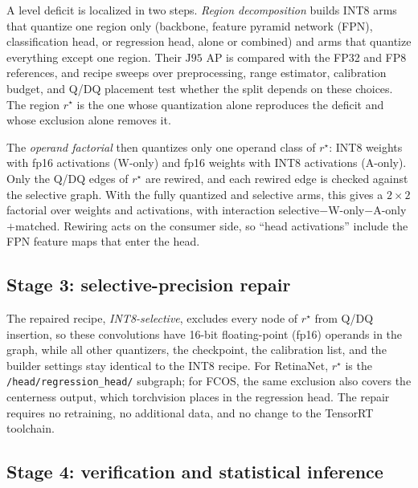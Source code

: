 \documentclass[a4paper,fleqn]{cas-dc}
\newcommand{\Jclean}{\mathrm{J95}}
\begin{document}
A level deficit is localized in two steps. \emph{Region decomposition} builds INT8 arms that quantize one region only (backbone, feature pyramid network (FPN), classification head, or regression head, alone or combined) and arms that quantize everything except one region. Their $\Jclean$ AP is compared with the FP32 and FP8 references, and recipe sweeps over preprocessing, range estimator, calibration budget, and Q/DQ placement test whether the split depends on these choices. The region $r^\star$ is the one whose quantization alone reproduces the deficit and whose exclusion alone removes it.

The \emph{operand factorial} then quantizes only one operand class of $r^\star$: INT8 weights with fp16 activations (W-only) and fp16 weights with INT8 activations (A-only). Only the Q/DQ edges of $r^\star$ are rewired, and each rewired edge is checked against the selective graph. With the fully quantized and selective arms, this gives a $2{\times}2$ factorial over weights and activations, with interaction selective$-$W-only$-$A-only$+$matched. Rewiring acts on the consumer side, so ``head activations'' include the FPN feature maps that enter the head.

\subsection{Stage 3: selective-precision repair}
\label{sec:selective}

The repaired recipe, \emph{INT8-selective}, excludes every node of $r^\star$ from Q/DQ insertion, so these convolutions have 16-bit floating-point (fp16) operands in the graph, while all other quantizers, the checkpoint, the calibration list, and the builder settings stay identical to the INT8 recipe. For RetinaNet, $r^\star$ is the \texttt{/head/regression\_head/} subgraph; for FCOS, the same exclusion also covers the centerness output, which torchvision places in the regression head. The repair requires no retraining, no additional data, and no change to the TensorRT toolchain.

\subsection{Stage 4: verification and statistical inference}
\label{sec:bootstrap}
\end{document}
